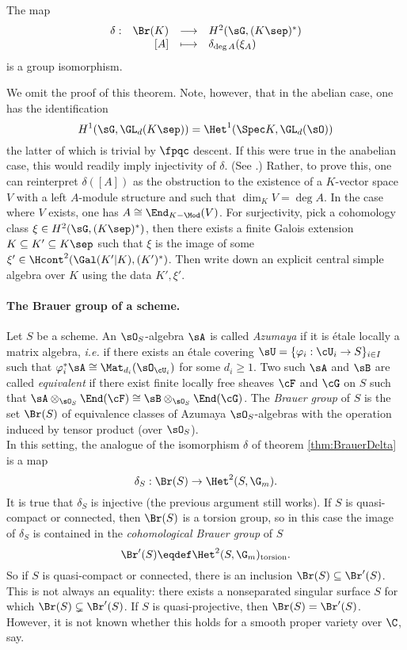 \begin{thm} \label{thm:BrauerDelta}
The map
$$
\begin{array}{rrcl}
\delta : & \Br(K) &  \longrightarrow & H^2(\sG, (K\sep)^*) \\
& [A] & \longmapsto & \delta_{\deg A} (\xi_A)
\end{array}
$$
is a group isomorphism.
\end{thm}

We omit the proof of this theorem. Note, however, that in the abelian case, one has the identification
$$
H^1 (\sG, \GL_d(K\sep)) = \Het^1 (\Spec K, \GL_d(\sO))
$$
the latter of which is trivial by $\fpqc$ descent. If this were true in the anabelian case, this would readily imply injectivity of $\delta$. (See \cite{SGA4.5}.) Rather, to prove this, one can reinterpret $\delta([A])$ as the obstruction to the existence of a $K$-vector space $V$ with a left $A$-module structure and such that $\dim_K V = \deg A$. In the case where $V$ exists, one has $A \cong \End_{K-\Mod} (V)$. For surjectivity, pick a cohomology class $\xi \in H^2(\sG, (K\sep)^*)$, then there exists a finite Galois extension $K \subseteq K' \subseteq K\sep$ such that $\xi$ is the image of some $\xi' \in \Hcont^2(\Gal(K'|K), (K')^*)$. Then write down an explicit central simple algebra over $K$ using the data $K', \xi'$.

\paragraph{The Brauer group of a scheme.}
Let $S$ be a scheme. An $\sO_S$-algebra $\sA$ is called \emph{Azumaya} if it is \'etale locally a matrix algebra, {\it i.e.} if there exists an \'etale covering $\sU = \{ \varphi_i : \cU_i \to S \}_{i \in I}$ such that $\varphi_i^*\sA \cong \Mat_{d_i}(\sO_{\cU_i})$ for some $d_i \geqslant 1$. Two such $\sA$ and $\sB$ are called \emph{equivalent} if there exist finite locally free sheaves $\cF$ and $\cG$ on $S$ such that $\sA \otimes_{\sO_S} \End(\cF) \cong \sB \otimes_{\sO_S} \End(\cG)$. The \emph{Brauer group} of $S$ is the set $\Br(S)$ of equivalence classes of Azumaya $\sO_S$-algebras with the operation induced by tensor product (over $\sO_S$). 
\\
In this setting, the analogue of the isomorphism $\delta$ of theorem \ref{thm:BrauerDelta} is a map 
$$
\delta_S: \Br(S) \to \Het^2(S,\G_m).
$$ 
It is true that $\delta_S$ is injective (the previous argument still works). If $S$ is quasi-compact or connected, then $\Br(S)$ is a torsion group, so in this case the image of $\delta_S$ is contained in the \emph{cohomological Brauer group} of $S$ 
$$
\Br'(S) \eqdef \Het^2(S,\G_m)_\text{torsion}.
$$ 
So if $S$ is quasi-compact or connected, there is an inclusion $\Br(S) \subseteq \Br'(S)$. This is not always an equality: there exists a nonseparated singular surface $S$ for which $\Br(S) \subsetneq \Br'(S)$. If $S$ is quasi-projective, then $\Br(S) = \Br'(S)$. However, it is not known whether this holds for a smooth proper variety over $\C$, say.  


